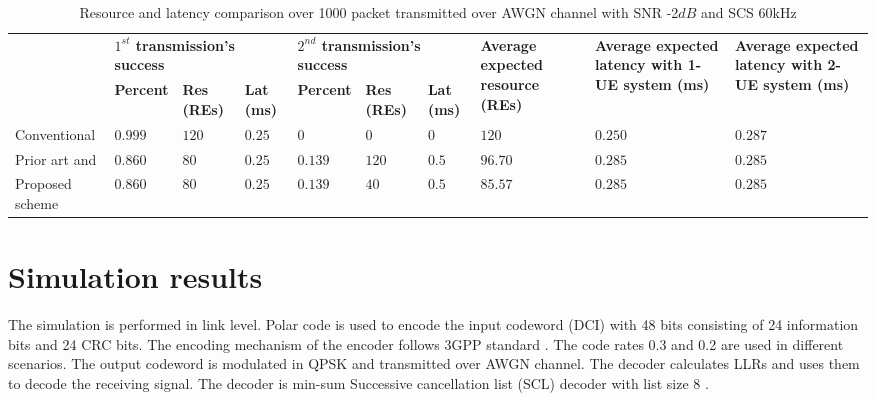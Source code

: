 \documentclass[conference,10pt]{IEEEtran}
\begin{document}
\begin{table}[htbp]
\caption{Resource and latency comparison over 1000 packet transmitted over AWGN channel with SNR -2$dB$ and SCS 60kHz}
\begin{center}
\begin{tabular}{ |p{4.6em}|p{3em}|p{2em}|p{2em}|p{3em}|p{2em}|p{2em}|p{5em}|p{8em}|p{8em}|}
 \hline
 \multirow{2}{6em}{} & \multicolumn{3}{p{6em}}{\textbf{$1^{st}$ transmission's success}}& \multicolumn{3}{|p{6em}|}{\textbf{$2^{nd}$ transmission's success}}& \multirow{2}{6em}{\textbf{Average expected resource (REs)}}& \multirow{2}{8em}{\textbf{Average expected latency with 1-UE system (ms)}}& \multirow{2}{8em}{\textbf{Average expected latency with 2-UE system (ms)}}\\\cline{2-7}
 &\textbf{Percent} & \textbf{Res (REs)}&\textbf{Lat (ms)}&\textbf{Percent} & \textbf{Res (REs)}&\textbf{Lat (ms)} & & &  \\
 \hline
 Conventional&$0.999$&$120$& $0.25$& $0$& $0$ & $0$ &$120$&$0.250$&$0.287$\\
 \hline
 Prior art\cite{b3} and \cite{b4} &$0.860$&$80$& $0.25$& $0.139$& $120$ &  $0.5$&$96.70$&$0.285$&$0.285$\\
  \hline
 Proposed scheme &$0.860$&$80$&$0.25$ & $0.139$& $40$ &  $0.5$&$85.57$&$0.285$&$0.285$\\
 
 

 \hline
\end{tabular}
\label{tab1}
\end{center}
\end{table}
\section{Simulation results}

The simulation is performed in link level. Polar code is used to encode the input codeword (DCI) with 48 bits consisting of 24 information bits and 24 CRC bits. The encoding mechanism of the encoder follows 3GPP standard \cite{b8}. The code rates 0.3 and 0.2 are used in different scenarios. The output codeword is modulated in QPSK and transmitted over AWGN channel. The decoder calculates LLRs and uses them to decode the receiving signal. The decoder is min-sum Successive cancellation list (SCL) decoder with list size 8 \cite{b9}.
\end{document}
